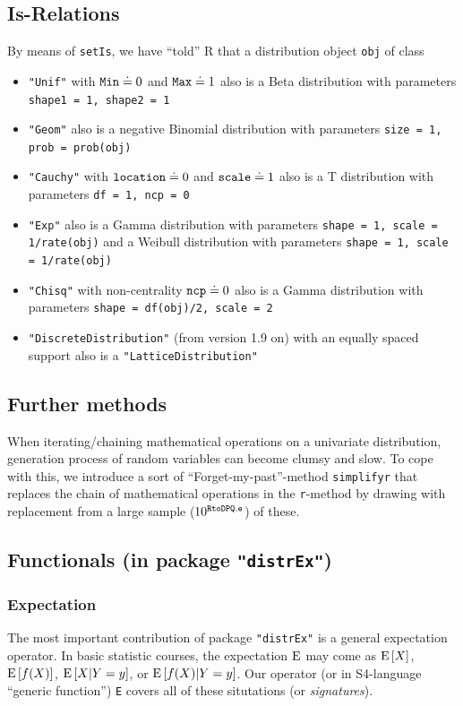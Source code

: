 \documentclass[11pt]{article}
\newcommand{\code}[1]{{\tt #1}}
\newcommand{\pkg}[1]{{\tt "#1"}}
\begin{document}
\subsection{Is-Relations}
%
By means of \code{setIs}, we have ``told'' {\sf R}  that a distribution object
\code{obj} of class
\begin{itemize}
  \item  \code{"Unif"} with  $\code{Min} \doteq 0$ and  $\code{Max} \doteq 1$
   also is a Beta distribution with parameters \code{shape1 = 1, shape2 = 1}
  \item  \code{"Geom"} also is a negative Binomial distribution with parameters
         \code{size = 1, prob = prob(obj)}
  \item \code{"Cauchy"} with $\code{location} \doteq 0$ and
         $\code{scale}\doteq 1$ also is a T distribution with parameters
         \code{df = 1, ncp = 0}
  \item \code{"Exp"} also is a Gamma distribution with parameters
         \code{shape = 1, scale = 1/rate(obj)} and
         a Weibull  distribution with parameters
         \code{shape = 1, scale = 1/rate(obj)}
  \item \code{"Chisq"} with non-centrality $\code{ncp}\doteq 0$ also is a
        Gamma distribution with parameters \code{shape = df(obj)/2, scale = 2}
  \item \code{"DiscreteDistribution"}  (from version 1.9 on) with an equally
         spaced support also is a \code{"LatticeDistribution"}
\end{itemize}
%
\subsection{Further methods}
%
When iterating/chaining mathematical operations on a univariate distribution,
generation process of random variables can become clumsy and slow.
To cope with this, we introduce a sort of ``Forget-my-past''-method
\code{simplifyr} that replaces the  chain of mathematical operations in
the \code{r}-method by drawing with replacement from a large
sample ($10^{\tt RtoDPQ.e}$) of these.
%
\subsection[Functionals (in package distrEx)]%
{Functionals (in package \pkg{distrEx})}\label{Functionals}
%
\subsubsection{Expectation}
The most important contribution of package \pkg{distrEx} is a general
expectation operator. In basic statistic courses, the expectation
${\rm E}$ may come as ${\rm E}\,[X]$, ${\rm E}\,[f(X)]$, ${\rm E}\,[X|Y=y]$,
or ${\rm E}\,[f(X)|Y=y]$. Our operator (or in S4-language ``generic function'')
\code{E} covers all of these situtations (or {\it signatures\/}).
\end{document}
